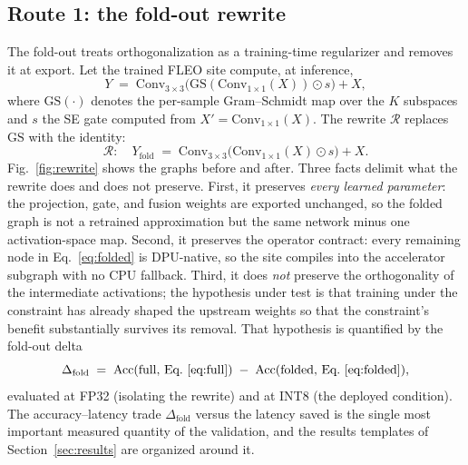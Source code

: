 \documentclass[onecolumn,journal]{IEEEtran}
\newcommand{\Conv}{\mathrm{Conv}}
\begin{document}
\subsection{Route 1: the fold-out rewrite}\label{sec:foldout}
The fold-out treats orthogonalization as a training-time regularizer and removes it at
export. Let the trained FLEO site compute, at inference,
\begin{equation}
Y \;=\; \Conv_{3\times3}\!\big(\mathrm{GS}(\Conv_{1\times1}(X)) \odot s\big) + X ,
\label{eq:full}
\end{equation}
where $\mathrm{GS}(\cdot)$ denotes the per-sample Gram--Schmidt map over the $K$
subspaces and $s$ the SE gate computed from $X'=\Conv_{1\times1}(X)$. The rewrite
$\mathcal{R}$ replaces $\mathrm{GS}$ with the identity:
\begin{equation}
\mathcal{R}:\quad
Y_{\mathrm{fold}} \;=\; \Conv_{3\times3}\!\big(\Conv_{1\times1}(X) \odot s\big) + X .
\label{eq:folded}
\end{equation}
Fig.~\ref{fig:rewrite} shows the graphs before and after. Three facts delimit what the
rewrite does and does not preserve. First, it preserves \emph{every learned parameter}:
the projection, gate, and fusion weights are exported unchanged, so the folded graph is
not a retrained approximation but the same network minus one activation-space map.
Second, it preserves the operator contract: every remaining node in
Eq.~\eqref{eq:folded} is DPU-native, so the site compiles into the accelerator subgraph
with no CPU fallback. Third, it does \emph{not} preserve the orthogonality of the
intermediate activations; the hypothesis under test is that training under the
constraint has already shaped the upstream weights so that the constraint's benefit
substantially survives its removal. That hypothesis is quantified by the fold-out delta
\begin{equation}
\Delta_{\mathrm{fold}} \;=\; \mathrm{Acc}(\text{full, Eq.~\eqref{eq:full}})
\;-\; \mathrm{Acc}(\text{folded, Eq.~\eqref{eq:folded}}) ,
\label{eq:deltafold}
\end{equation}
evaluated at FP32 (isolating the rewrite) and at INT8 (the deployed condition). The
accuracy--latency trade $\Delta_{\mathrm{fold}}$ versus the latency saved is the single
most important measured quantity of the validation, and the results templates of
Section~\ref{sec:results} are organized around it.
\end{document}
